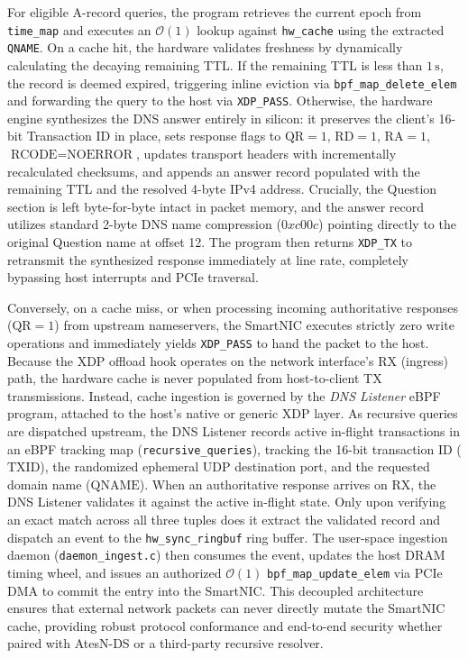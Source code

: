 \documentclass[a4paper,fleqn,colorlinks,hidelinks]{cas-sc}
\begin{document}
For eligible A-record queries, the program retrieves the current epoch from \texttt{time\_map} and executes an $\mathcal{O}(1)$ lookup against \texttt{hw\_cache} using the extracted \texttt{QNAME}. On a cache hit, the hardware validates freshness by dynamically calculating the decaying remaining TTL. If the remaining TTL is less than $1\,\text{s}$, the record is deemed expired, triggering inline eviction via \texttt{bpf\_map\_delete\_elem} and forwarding the query to the host via \texttt{XDP\_PASS}. Otherwise, the hardware engine synthesizes the DNS answer entirely in silicon: it preserves the client's 16-bit Transaction ID in place, sets response flags to $\text{QR}=1$, $\text{RD}=1$, $\text{RA}=1$, $\text{RCODE}=\text{NOERROR}$, updates transport headers with incrementally recalculated checksums, and appends an answer record populated with the remaining TTL and the resolved 4-byte IPv4 address. Crucially, the Question section is left byte-for-byte intact in packet memory, and the answer record utilizes standard 2-byte DNS name compression ($0xc00c$) pointing directly to the original Question name at offset 12. The program then returns \texttt{XDP\_TX} to retransmit the synthesized response immediately at line rate, completely bypassing host interrupts and PCIe traversal.

Conversely, on a cache miss, or when processing incoming authoritative responses ($\text{QR}=1$) from upstream nameservers, the SmartNIC executes strictly zero write operations and immediately yields \texttt{XDP\_PASS} to hand the packet to the host. Because the XDP offload hook operates on the network interface's RX (ingress) path, the hardware cache is never populated from host-to-client TX transmissions. Instead, cache ingestion is governed by the \textit{DNS Listener} eBPF program, attached to the host's native or generic XDP layer. As recursive queries are dispatched upstream, the DNS Listener records active in-flight transactions in an eBPF tracking map (\texttt{recursive\_queries}), tracking the 16-bit transaction ID ($\text{TXID}$), the randomized ephemeral UDP destination port, and the requested domain name ($\text{QNAME}$). When an authoritative response arrives on RX, the DNS Listener validates it against the active in-flight state. Only upon verifying an exact match across all three tuples does it extract the validated record and dispatch an event to the \texttt{hw\_sync\_ringbuf} ring buffer. The user-space ingestion daemon (\texttt{daemon\_ingest.c}) then consumes the event, updates the host DRAM timing wheel, and issues an authorized $\mathcal{O}(1)$ \texttt{bpf\_map\_update\_elem} via PCIe DMA to commit the entry into the SmartNIC. This decoupled architecture ensures that external network packets can never directly mutate the SmartNIC cache, providing robust protocol conformance and end-to-end security whether paired with AtesN-DS or a third-party recursive resolver.
\end{document}
